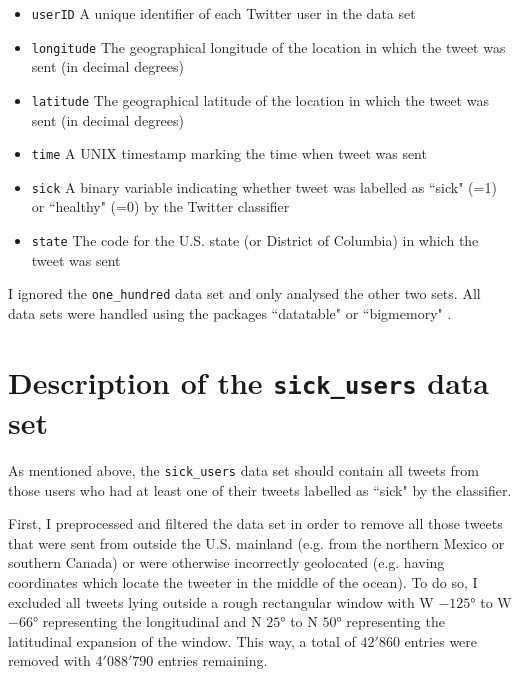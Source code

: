 \documentclass[11pt, a4paper,twoside]{report}\usepackage[]{graphicx}\usepackage[]{color}
\begin{document}
\begin{itemize}
  \item \texttt{userID} A unique identifier of each Twitter user in the data set
  \item \texttt{longitude} The geographical longitude of the location in which the tweet was sent (in decimal degrees)
  \item \texttt{latitude} The geographical latitude  of the location in which the tweet was sent (in decimal degrees)
  \item \texttt{time} A UNIX timestamp marking the time when tweet was sent
  \item \texttt{sick} A binary variable indicating whether tweet was labelled as ``sick" (=1) or ``healthy" (=0) by the Twitter classifier
  \item \texttt{state} The code for the U.S. state (or District of Columbia) in which the tweet was sent
\end{itemize}

I ignored the \texttt{one\_hundred} data set and only analysed the other two sets. All data sets were handled using the packages ``datatable" \citep{datatable} or ``bigmemory" \citep{bigmemory}.

\section{Description of the \texttt{sick\_users} data set}
\label{sec:sick_user_exploratory}


As mentioned above, the \texttt{sick\_users} data set should contain all tweets from those users who had at least one of their tweets labelled as ``sick" by the classifier.

First, I preprocessed and filtered the data set in order to remove all those tweets that were sent from outside the U.S. mainland (e.g. from the northern Mexico or southern Canada) or were otherwise incorrectly geolocated (e.g. having coordinates which locate the tweeter in the middle of the ocean). To do so, I excluded all tweets lying outside a rough rectangular window with W $-125$° to W $-66$° representing the longitudinal and N $25$° to N $50$° representing the latitudinal expansion of the window. This way, a total of $42'860$ entries were removed with $4'088'790$ entries remaining.
\end{document}
